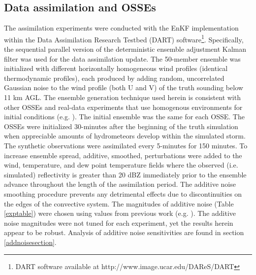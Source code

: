\subsection{Data assimilation and OSSEs}
The assimilation experiments were conducted with the EnKF implementation within the Data Assimilation Research Testbed (DART) software\footnote{DART software available at http://www.image.ucar.edu/DAReS/DART}. Specifically, the sequential parallel version \citep{andersoncollins07} of the deterministic ensemble adjustment Kalman filter \citep{anderson01} was used for the data assimilation update. The 50-member ensemble was initialized with different horizontally homogeneous wind profiles (identical thermodynamic profiles), each produced by adding random, uncorrelated Gaussian noise to the wind profile (both U and V) of the truth sounding below 11 km AGL. The ensemble generation technique used herein is consistent with other OSSEs and real-data experiments that use homogenous environments for initial conditions (e.g. \citealt{dowelletal04}). The initial ensemble was the same for each OSSE. The OSSEs were initialized 30-minutes after the beginning of the truth simulation when appreciable amounts of hydrometeors develop within the simulated storm. The synthetic observations were assimilated every 5-minutes for 150 minutes. To increase ensemble spread, additive, smoothed, perturbations were added to the wind, temperature, and dew point temperature fields where the observed (i.e. simulated) reflectivity is greater than 20 dBZ immediately prior to the ensemble advance \citep{dowellwicker09} throughout the length of the assimilation period. The additive noise smoothing procedure prevents any detrimental effects due to discontinuities on the edges of the convective system. The magnitudes of additive noise (Table \ref{exptable}) were chosen using values from previous work (e.g. \citealt{dowellwicker09}). The additive noise magnitudes were not tuned for each experiment, yet the results herein appear to be robust. Analysis of additive noise sensitivities are found in section \ref{addnoisesection}.

